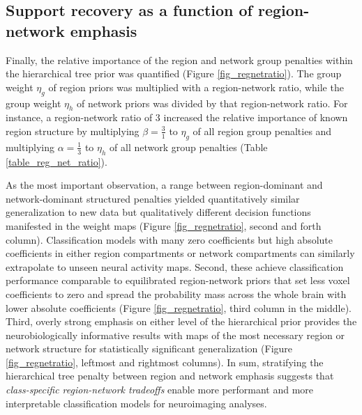 \documentclass[runningheads,a4paper]{llncs}
\begin{document}
\subsection{Support recovery as a function of region-network emphasis}
Finally, the relative importance of the
region and network group penalties within the hierarchical tree prior
was quantified (Figure \ref{fig_regnetratio}).
The group weight $\eta_g$ of region priors was multiplied with a
region-network ratio, while the
group weight $\eta_h$ of network priors was divided by that
region-network ratio. For instance, a region-network ratio of 3
increased the relative importance of known region structure
by multiplying $\beta = \frac{3}{1}$ to
$\eta_g$ of all region group penalties
and multiplying
$\alpha = \frac{1}{3}$ to $\eta_h$ of all network group penalties
(Table \ref{table_reg_net_ratio}).


As the most important observation,
a range between region-dominant and network-dominant structured penalties
yielded quantitatively similar generalization to new data
but qualitatively different decision functions manifested in the weight maps
(Figure \ref{fig_regnetratio}, second and forth column).
Classification models with many zero coefficients but high absolute
coefficients in either region compartments or network compartments
can similarly extrapolate to unseen neural activity maps.
Second,
these achieve classification performance
comparable to equilibrated region-network priors
that set less voxel coefficients to zero and spread the
probability mass across the whole brain
with lower absolute coefficients
(Figure \ref{fig_regnetratio}, third column in the middle).
Third,
overly strong emphasis on either level of the hierarchical prior
provides the neurobiologically informative results with maps
of the most necessary region or network structure for
statistically significant generalization
(Figure \ref{fig_regnetratio}, leftmost and rightmost columns).
%
In sum,
stratifying the hierarchical tree penalty between region and network emphasis
suggests that \textit{class-specific region-network tradeoffs}
enable more performant and more interpretable classification models
for neuroimaging analyses.
\end{document}
